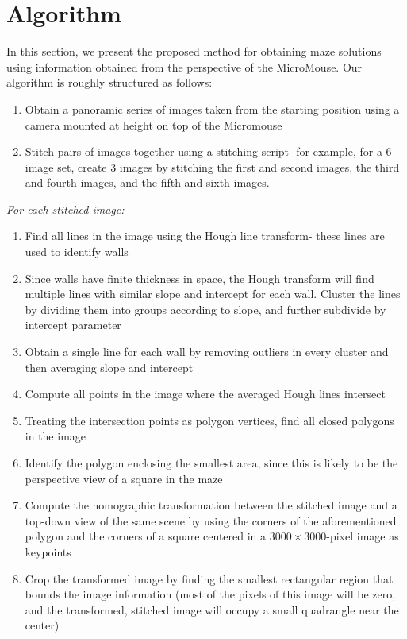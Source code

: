 \documentclass[10pt,twocolumn,letterpaper]{article}
\begin{document}
\section{Algorithm}
\label{sec:algorithm}

In this section, we present the proposed method for obtaining maze solutions using information obtained from the
perspective of the MicroMouse.  Our algorithm is roughly structured as follows:

\begin{enumerate}
	\item Obtain a panoramic series of images taken from the starting position using a camera mounted at height on top
	of the Micromouse
	\item Stitch pairs of images together using a stitching script- for example, for a 6-image set, create 3 images by stitching the first and second images, the third and fourth images, and the fifth and sixth images.
\end{enumerate}

\textit{For each stitched image:}
\begin{enumerate}
	\item Find all lines in the image using the Hough line transform- these lines are used to identify walls
	\item Since walls have finite thickness in space, the Hough transform will find multiple lines with similar slope
	and intercept for each wall.  Cluster the lines by dividing them into groups according to slope, and further
	subdivide by intercept parameter
	\item Obtain a single line for each wall by removing outliers in every cluster and then averaging slope and
	intercept
	\item Compute all points in the image where the averaged Hough lines intersect
	\item Treating the intersection points as polygon vertices, find all closed polygons in the image
	\item Identify the polygon enclosing the smallest area, since this is likely to be the perspective view of a square
	in the maze
	\item Compute the homographic transformation between the stitched image and a top-down view of the same scene by
	using the corners of the aforementioned polygon and the corners of a square centered in a $3000\times 3000$-pixel
	image as keypoints
	\item Crop the transformed image by finding the smallest rectangular region that bounds the image information (most
	of the pixels of this image will be zero, and the transformed, stitched image will occupy a small quadrangle near
	the center)
\end{enumerate}
\end{document}
